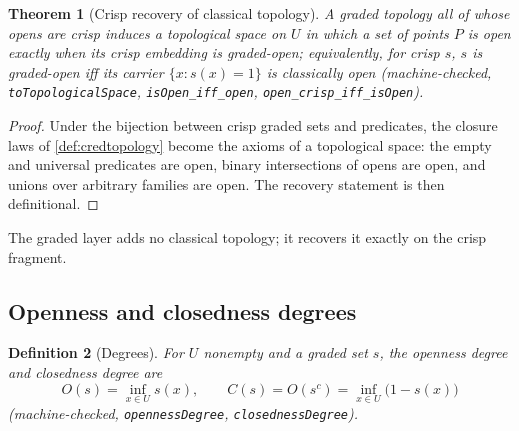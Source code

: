 \documentclass[11pt,a4paper]{article}
\newtheorem{theorem}{Theorem}[section]
\newtheorem{definition}[theorem]{Definition}
\begin{document}
\begin{theorem}[Crisp recovery of classical topology]
\label{thm:crisp-topology}
A graded topology all of whose opens are crisp induces a topological
space on $U$ in which a set of points $P$ is open exactly when its
crisp embedding is graded-open; equivalently, for crisp $s$, $s$ is
graded-open iff its carrier $\{x : s(x) = 1\}$ is classically open
(machine-checked, \texttt{toTopologicalSpace},
\texttt{isOpen\_iff\_open}, \texttt{open\_crisp\_iff\_isOpen}).
\end{theorem}
\begin{proof}
Under the bijection between crisp graded sets and predicates, the
closure laws of \cref{def:credtopology} become the axioms of a
topological space: the empty and universal predicates are open,
binary intersections of opens are open, and unions over arbitrary
families are open.
The recovery statement is then definitional.
\end{proof}

The graded layer adds no classical topology; it recovers it exactly on
the crisp fragment.

\subsection{Openness and closedness degrees}

\begin{definition}[Degrees]
\label{def:degrees}
For $U$ nonempty and a graded set $s$, the \emph{openness degree} and
\emph{closedness degree} are
\[
  O(s) = \inf_{x \in U} s(x),
  \qquad
  C(s) = O(s^{c}) = \inf_{x \in U} \bigl(1 - s(x)\bigr)
\]
(machine-checked, \texttt{opennessDegree},
\texttt{closednessDegree}).
\end{definition}
\end{document}
